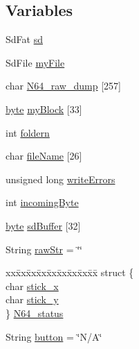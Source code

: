 \subsection*{Variables}
\begin{DoxyCompactItemize}
\item 
Sd\-Fat \hyperlink{Uno__N64__Controller__Pak__Reader_8ino_a15e6b7e1f0fb2d1e0fe1654721bb5302}{sd}
\item 
Sd\-File \hyperlink{Uno__N64__Controller__Pak__Reader_8ino_a16f52ba77735956c329c6df0a52aba8b}{my\-File}
\item 
char \hyperlink{Uno__N64__Controller__Pak__Reader_8ino_ae8803a7ccd85598955cfa9d4f3561ac9}{N64\-\_\-raw\-\_\-dump} \mbox{[}257\mbox{]}
\item 
\hyperlink{Arduino_8h_ab8ef12fab634c171394422d0ee8baf94}{byte} \hyperlink{Uno__N64__Controller__Pak__Reader_8ino_a8b202f44f04f63fc925047860625793d}{my\-Block} \mbox{[}33\mbox{]}
\item 
int \hyperlink{Uno__N64__Controller__Pak__Reader_8ino_a682c3bf7777c52fec7975e785aaa5eb7}{foldern}
\item 
char \hyperlink{Uno__N64__Controller__Pak__Reader_8ino_ad5627db776ac243c3c2acb1bf6928138}{file\-Name} \mbox{[}26\mbox{]}
\item 
unsigned long \hyperlink{Uno__N64__Controller__Pak__Reader_8ino_ab5b51e6cb78664c28c70281cf73e6c92}{write\-Errors}
\item 
int \hyperlink{Uno__N64__Controller__Pak__Reader_8ino_ae563354a0218546aca0b276f84a85755}{incoming\-Byte}
\item 
\hyperlink{Arduino_8h_ab8ef12fab634c171394422d0ee8baf94}{byte} \hyperlink{Uno__N64__Controller__Pak__Reader_8ino_ae7ec651b340ef0dc409255ab3d008396}{sd\-Buffer} \mbox{[}32\mbox{]}
\item 
String \hyperlink{Uno__N64__Controller__Pak__Reader_8ino_a2c9dda16ae6e126e47f234ee77a306c9}{raw\-Str} = \char`\"{}\char`\"{}
\item 
\begin{tabbing}
xx\=xx\=xx\=xx\=xx\=xx\=xx\=xx\=xx\=\kill
struct \{\\
\>char \hyperlink{Uno__N64__Controller__Pak__Reader_8ino_a462c4d416ae2f845eedf11622b33f5ce}{stick\_x}\\
\>char \hyperlink{Uno__N64__Controller__Pak__Reader_8ino_a1ba71f2f35d51bda37947b2cc56f2804}{stick\_y}\\
\} \hyperlink{Uno__N64__Controller__Pak__Reader_8ino_a04933689c38920a7de42b5d501f2147f}{N64\_status}\\

\end{tabbing}\item 
String \hyperlink{Uno__N64__Controller__Pak__Reader_8ino_a0a7e6169ae96e651da0b37fae3034554}{button} = \char`\"{}N/A\char`\"{}
\end{DoxyCompactItemize}


